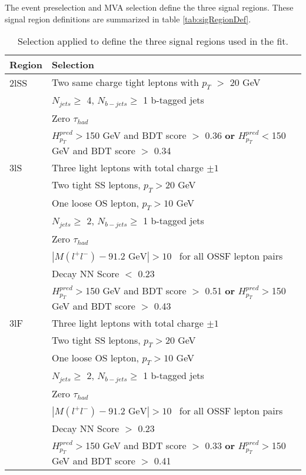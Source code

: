 The event preselection and MVA selection define the three signal regions. These signal region definitions are summarized in table \ref{tab:sigRegionDef}.

\begin{table}[h!]
  \begin{center}
  \begin{tabular}{ll}
  \hline\hline
  Region & Selection \\
  \hline
  2lSS & Two same charge tight leptons with $p_T$ $>$ 20 GeV \\
  & $N_{jets}\geq$ 4, $N_{b-jets}\geq$ 1 b-tagged jets \\
  & Zero $\tau_{had}$\\
  & $H^{pred}_{p_T}>$150 GeV and BDT score $>$ 0.36 \textbf{or} $H^{pred}_{p_T}<$150 GeV and BDT score $>$ 0.34 \\
  \hline
  3lS & Three light leptons with total charge $\pm 1$ \\
  & Two tight SS leptons, $p_T > 20$ GeV \\
  & One loose OS lepton, $p_T > 10$ GeV \\
  & $N_{jets}\geq$ 2, $N_{b-jets}\geq$ 1 b-tagged jets \\
  & Zero $\tau_{had}$ \\           
  & $|M(l^+l^-)-91.2\textrm{ GeV}| > 10$~\GeV{} for all OSSF lepton pairs \\
  & Decay NN Score $<$ 0.23 \\
  & $H^{pred}_{p_T}>$150 GeV and BDT score $>$ 0.51 \textbf{or} $H^{pred}_{p_T}>$150 GeV and BDT score $>$ 0.43 \\
  \hline
  3lF & Three light leptons with total charge $\pm 1$ \\
  & Two tight SS leptons, $p_T > 20$ GeV \\                                                                                  
  & One loose OS lepton, $p_T > 10$ GeV \\                                                                                   
  & $N_{jets}\geq$ 2, $N_{b-jets}\geq$ 1 b-tagged jets \\
  & Zero $\tau_{had}$ \\
  & $|M(l^+l^-)-91.2\textrm{ GeV}| > 10$~\GeV{} for all OSSF lepton pairs \\                                                 
  & Decay NN Score $>$ 0.23 \\
  & $H^{pred}_{p_T}>$150 GeV and BDT score $>$ 0.33 \textbf{or} $H^{pred}_{p_T}>$150 GeV and BDT score $>$ 0.41 \\
  \hline\hline
  \end{tabular}
  \end{center}
  \caption{Selection applied to define the three signal regions used in the fit.}
  \label{tab:sigRegionCuts}
\end{table}

